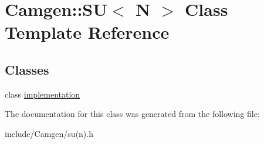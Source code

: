 \hypertarget{a00511}{\section{Camgen\-:\-:S\-U$<$ N $>$ Class Template Reference}
\label{a00511}
}
\subsection*{Classes}
\begin{DoxyCompactItemize}
\item 
class \hyperlink{a00286}{implementation}
\end{DoxyCompactItemize}


The documentation for this class was generated from the following file\-:\begin{DoxyCompactItemize}
\item 
include/\-Camgen/su(n).\-h\end{DoxyCompactItemize}
